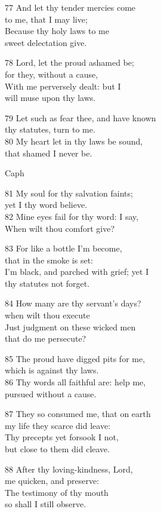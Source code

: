 77 And let thy tender mercies come\\
to me, that I may live;\\
Because thy holy laws to me\\
sweet delectation give.

78 Lord, let the proud ashamed be;\\
for they, without a cause,\\
With me perversely dealt: but I\\
will muse upon thy laws.

79 Let such as fear thee, and have known\\
thy statutes, turn to me.\\
80 My heart let in thy laws be sound,\\
that shamed I never be.


Caph

81 My soul for thy salvation faints;\\
yet I thy word believe.\\
82 Mine eyes fail for thy word: I say,\\
When wilt thou comfort give?

83 For like a bottle I’m become,\\
that in the smoke is set:\\
I’m black, and parched with grief; yet I\\
thy statutes not forget.

84 How many are thy servant’s days?\\
when wilt thou execute\\
Just judgment on these wicked men\\
that do me persecute?

85 The proud have digged pits for me,\\
which is against thy laws.\\
86 Thy words all faithful are: help me,\\
pursued without a cause.

87 They so consumed me, that on earth\\
my life they scarce did leave:\\
Thy precepts yet forsook I not,\\
but close to them did cleave.

88 After thy loving-kindness, Lord,\\
me quicken, and preserve:\\
The testimony of thy mouth\\
so shall I still observe.

